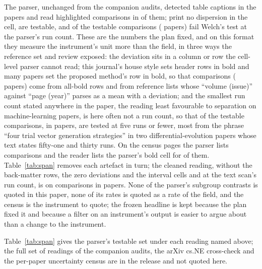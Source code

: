 \documentclass[preprint,review,12pt]{elsarticle}
\begin{document}
The parser, unchanged from the companion audits, detected \nATablesDetected{} table captions in the \nOParsed{} papers and read \nAComparisons{} highlighted comparisons in \nAClaimPapers{} of them; \nAPctNeitherCi{} print no dispersion in the cell, \nAPctTestable{} are testable, and \nAPctFailCi{} of the \nANTestable{} testable comparisons (\nAPapersTestable{} papers) fail Welch's test at the parser's run count. These are the numbers the plan fixed, and on this format they measure the instrument's unit more than the field, in three ways the reference set and review exposed: the deviation sits in a column or row the cell-level parser cannot read; this journal's house style sets header rows in bold and many papers set the proposed method's row in bold, so that \nRbRowBoldOnlyN{} comparisons (\nRbRowBoldPapers{} papers) come from all-bold rows and \nPrBackMatterAllComparisons{} from reference lists whose ``volume (issue)'' against ``page (year)'' parses as a mean with a deviation; and the smallest run count stated anywhere in the paper, the reading least favourable to separation on machine-learning papers, is here often not a run count, so that \nPrTestedAtFiveOrFewer{} of the testable comparisons, in \nPrTestedAtFiveOrFewerPapers{} papers, are tested at five runs or fewer, most from the phrase ``four trial vector generation strategies'' in two differential-evolution papers whose text states fifty-one and thirty runs. On the census pages the parser lists \nCzPipeGroups{} comparisons and the reader lists the parser's bold cell for \nCzPipeFoundPct{} of them. Table~\ref{tab:span} removes each artefact in turn; the cleaned reading, without the back-matter rows, the zero deviations and the interval cells and at the text scan's run count, is \nPrCleanedScanFail{} on \nPrCleanedScanN{} comparisons in \nPrCleanedScanPapers{} papers. None of the parser's subgroup contrasts is quoted in this paper, none of its rates is quoted as a rate of the field, and the census is the instrument to quote; the frozen headline is kept because the plan fixed it and because a filter on an instrument's output is easier to argue about than a change to the instrument.

Table~\ref{tab:span} gives the parser's testable set under each reading named above; the full set of readings of the companion audits, the arXiv cs.NE cross-check and the per-paper uncertainty census are in the release and not quoted here.
\end{document}
